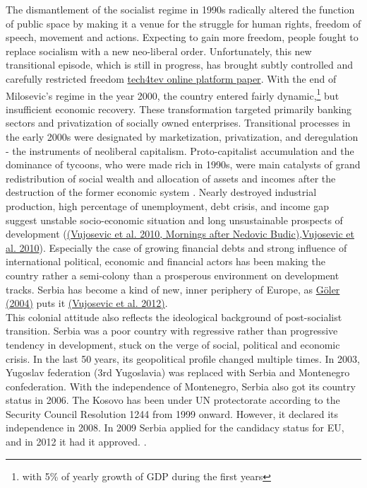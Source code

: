\documentclass[11pt]{report}
\begin{document}
The dismantlement of the socialist regime in 1990s radically altered the function of public space by making it a venue for the struggle for human rights, freedom of speech, movement and actions.
Expecting to gain more freedom, people fought to replace socialism with a new neo-liberal order.
Unfortunately, this new transitional episode, which is still in progress, has brought subtly controlled and carefully restricted freedom \href{}{tech4tev online platform paper}.
With the end of Milosevic's regime in the year 2000, the country entered fairly dynamic,\footnote{with 5\% of yearly growth of GDP during the first years} but insufficient economic recovery.
These transformation targeted primarily banking sectors and privatization of socially owned enterprises. Transitional processes in the early 2000s were designated by marketization, privatization, and deregulation - the instruments of neoliberal capitalism.
Proto-capitalist accumulation and the dominance of tycoons, who were made rich in 1990s, were main catalysts of grand redistribution of social wealth and allocation of assets and incomes after the destruction of the former economic system \href{}{\citealt{vujosevic_collapse_2010}}.
Nearly destroyed industrial production, high percentage of unemployment, debt crisis, and income gap suggest unstable socio-economic situation and long unsustainable prospects of development (\href{}{(Vujosevic et al. 2010, Mornings after Nedovic Budic)},\href{}{Vujosevic et al. 2010}).
Especially the case of growing financial debts and strong influence of international political, economic and financial actors has been making the country rather a semi-colony than a prosperous environment on development tracks. Serbia has become a kind of new, inner periphery of Europe, as \href{}{Göler (2004)} puts it \href{}{(Vujosevic et al. 2012)}.
\\     
This colonial attitude also reflects the ideological background of post-socialist transition.
Serbia was a poor country with regressive rather than progressive tendency in development, stuck on the verge of social, political and economic crisis.
In the last 50 years, its geopolitical profile changed multiple times.
 In 2003, Yugoslav federation (3rd Yugoslavia) was replaced with Serbia and Montenegro confederation.
With the independence of Montenegro, Serbia also got its country status in 2006.
The Kosovo has been under UN protectorate according to the Security Council Resolution 1244 from 1999 onward. However, it declared its independence in 2008.
In 2009 Serbia applied for the candidacy status for EU, and in 2012 it had it approved. .
\\
\end{document}
